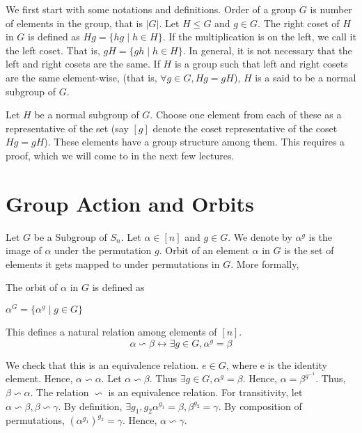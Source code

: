 
We first start with some notations and definitions. Order of a group $G$ is number of elements in the group, that is $|G|$. Let $H \le G$ and $g \in G$. The right coset of $H$ in $G$ is defined as 
$Hg = \{hg \mid h \in H\}$. If the multiplication is on the left, we call it the left coset. That is, $gH = \{gh \mid h \in H\}$. In general, it is not necessary that the left and right cosets are the same.
If $H$ is a group such that left and right cosets are the same element-wise, (that is, $\forall g \in G, Hg= gH$), $H$ is a said to be a normal subgroup of $G$.

Let $H$ be a normal subgroup of $G$. Choose one element from each of these as a representative of the set (say $[g]$ denote the coset representative of the coset $Hg = gH$). These elements have a group structure among them. This requires a proof, which we will come to in the next few lectures.

\section{Group Action and Orbits}

Let $G$ be a Subgroup of $S_n$. Let $\alpha \in [n]$ and $g \in G$. We denote by $\alpha^g$ is the image of $\alpha$ under the permutation $g$. 
Orbit of an element $\alpha$ in $G$ is the set of elements it gets mapped to under permutations in $G$. More formally,

\begin{definition}
The orbit of $\alpha$ in $G$ is defined as
\begin{center}
$\alpha^G = \{\alpha^g \mid g \in G\}$
\end{center}
\end{definition}

This defines a natural relation among elements of $[n]$.
$$\alpha \backsim \beta \leftrightarrow \exists g \in G, \alpha^g = \beta$$

We check that this is an equivalence relation. $e \in G$, where e is the identity element. Hence, $\alpha \backsim \alpha$. Let $\alpha \backsim \beta$. Thus $\exists g \in G, \alpha^g = \beta$. Hence, $\alpha = \beta^{g^{-1}}$. Thus, $\beta \backsim \alpha$. The relation $\backsim$ is an equivalence relation. For transitivity, let $\alpha \backsim \beta, \beta \backsim \gamma$. By definition, $\exists g_1, g_2 \alpha^{g_1} = \beta, \beta^{g_2} = \gamma$. By composition of permutations, $(\alpha^{g_1})^{g_2} = \gamma$. Hence, $\alpha \backsim \gamma$.

